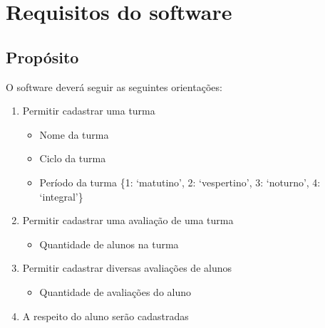 \documentclass[a4paper,12pt]{report}
\begin{document}
    \chapter{Requisitos do software}

        \section{Propósito}
        O software deverá seguir as seguintes orientações:

        \begin{enumerate}

            \item Permitir cadastrar uma turma

                \begin{itemize}

                    \item Nome da turma

                    \item Ciclo da turma

                    \item Período da turma \{1: `matutino', 2: `vespertino',
                        3: `noturno', 4: `integral'\}

                \end{itemize}

            \item Permitir cadastrar uma avaliação de uma turma

                \begin{itemize}

                    \item Quantidade de alunos na turma

                \end{itemize}

            \item Permitir cadastrar diversas avaliações de alunos

                \begin{itemize}

                    \item Quantidade de avaliações do aluno

                \end{itemize}

            \item A respeito do aluno serão cadastradas

                \begin{itemize}


\end{itemize}
\end{enumerate}
\end{document}
